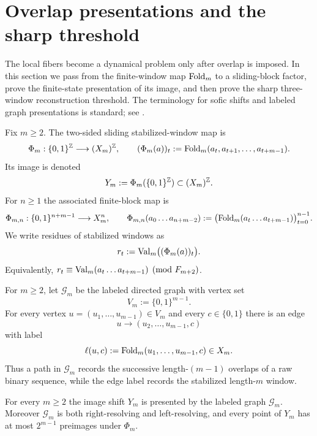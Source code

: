 ﻿\section{Overlap presentations and the sharp threshold}\label{sec:stab:conjugacy}

The local fibers become a dynamical problem only after overlap is imposed.  In
this section we pass from the finite-window map $\mathrm{Fold}_m$ to a sliding-block
factor, prove the finite-state presentation of its image, and then prove the
sharp three-window reconstruction threshold.  The terminology for sofic shifts
and labeled graph presentations is standard; see
\cite{LindMarcus1995,Kitchens1998,Nasu1995}.

\begin{definition}\label{def:Phi}
Fix $m\ge 2$.  The two-sided sliding stabilized-window map is
\[
\Phi_m:\{0,1\}^{\mathbb{Z}}\longrightarrow (X_m)^{\mathbb{Z}},
\qquad
(\Phi_m(a))_t:=\mathrm{Fold}_m(a_t,a_{t+1},\ldots,a_{t+m-1}).
\]
Its image is denoted
\[
Y_m:=\Phi_m(\{0,1\}^{\mathbb{Z}})\subset (X_m)^{\mathbb{Z}}.
\]
For $n\ge 1$ the associated finite-block map is
\[
\Phi_{m,n}:\{0,1\}^{n+m-1}\longrightarrow X_m^n,
\qquad
\Phi_{m,n}(a_0\ldots a_{n+m-2})
:=
\bigl(\mathrm{Fold}_m(a_t\ldots a_{t+m-1})\bigr)_{t=0}^{n-1}.
\]
We write residues of stabilized windows as
\[
r_t:=\mathrm{Val}_m\bigl((\Phi_m(a))_t\bigr).
\]
Equivalently,
$r_t\equiv\mathrm{Val}_m(a_t\ldots a_{t+m-1})\pmod {F_{m+2}}$.
\end{definition}

\begin{definition}\label{def:overlap-graph}
For $m\ge2$, let $\mathcal G_m$ be the labeled directed graph with vertex set
\[
V_m:=\{0,1\}^{m-1}.
\]
For every vertex $u=(u_1,\ldots,u_{m-1})\in V_m$ and every
$c\in\{0,1\}$ there is an edge
\[
u\longrightarrow (u_2,\ldots,u_{m-1},c)
\]
with label
\[
\ell(u,c):=\mathrm{Fold}_m(u_1,\ldots,u_{m-1},c)\in X_m.
\]
Thus a path in $\mathcal G_m$ records the successive length-$(m-1)$ overlaps
of a raw binary sequence, while the edge label records the stabilized
length-$m$ window.
\end{definition}

\begin{theorem}\label{thm:finite-state-lift}
For every $m\ge2$ the image shift $Y_m$ is presented by the labeled graph
$\mathcal G_m$.  Moreover $\mathcal G_m$ is both right-resolving and
left-resolving, and every point of $Y_m$ has at most $2^{m-1}$ preimages under
$\Phi_m$.
\end{theorem}

